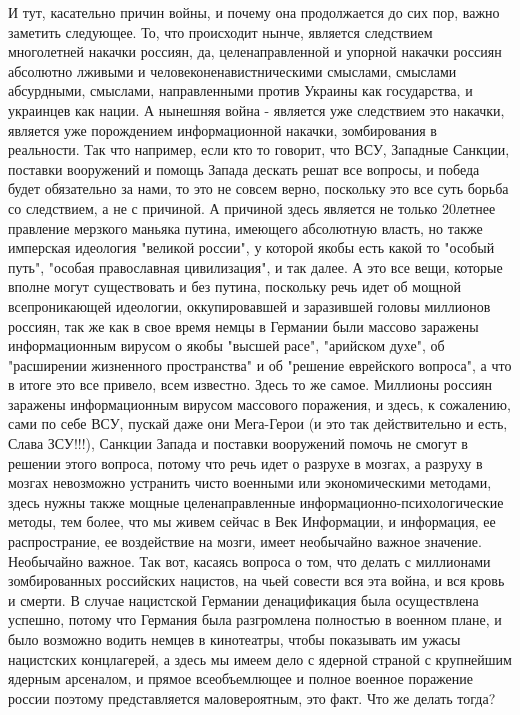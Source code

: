 И тут, касательно причин войны, и почему она продолжается до сих пор, важно
заметить следующее. То, что происходит нынче, является следствием многолетней
накачки россиян, да, целенаправленной и упорной накачки россиян абсолютно
лживыми и человеконенавистническими смыслами, смыслами абсурдными, смыслами,
направленными против Украины как государства, и украинцев как нации. А нынешняя
война - является уже следствием это накачки, является уже порождением
информационной накачки, зомбирования в реальности. Так что например, если кто
то говорит, что ВСУ, Западные Санкции, поставки вооружений и помощь Запада
дескать решат все вопросы, и победа будет обязательно за нами, то это не совсем
верно, поскольку это все суть борьба со следствием, а не с причиной.  А
причиной здесь является не только 20летнее правление мерзкого маньяка путина,
имеющего абсолютную власть, но также имперская идеология "великой россии", у
которой якобы есть какой то "особый путь", "особая православная цивилизация",  и так далее. А
это все вещи, которые вполне могут существовать и без путина, поскольку речь
идет об мощной всепроникающей идеологии, оккупировавшей и заразившей головы миллионов россиян, так же
как в свое время немцы в Германии были массово заражены информационным вирусом
о якобы "высшей расе", "арийском духе", об "расширении жизненного пространства"
и об "решение еврейского вопроса", а что в итоге это все привело, всем
известно. Здесь то же самое. Миллионы россиян заражены информационным вирусом
массового поражения, и здесь, к сожалению, сами по себе ВСУ, пускай даже они
Мега-Герои (и это так действительно и есть, Слава ЗСУ!!!), Санкции Запада и
поставки вооружений помочь не смогут в решении этого вопроса, потому что речь
идет о разрухе в мозгах, а разруху в мозгах невозможно устранить чисто военными
или экономическими методами, здесь нужны также мощные целенаправленные
информационно-психологические методы, тем более, что мы живем сейчас в Век
Информации, и информация, ее распространие, ее воздействие на мозги, имеет
необычайно важное значение. Необычайно важное.  Так вот, касаясь вопроса о том,
что делать с миллионами зомбированных российских нацистов, на чьей совести вся
эта война, и вся кровь и смерти. В случае нацистской Германии денацификация
была осуществлена успешно, потому что Германия была разгромлена полностью в
военном плане, и было возможно водить немцев в кинотеатры, чтобы показывать им ужасы нацистских концлагерей, а здесь мы имеем дело с ядерной страной с крупнейшим ядерным
арсеналом, и прямое всеобъемлющее и полное военное поражение россии поэтому
представляется маловероятным, это факт.  Что же делать тогда?

